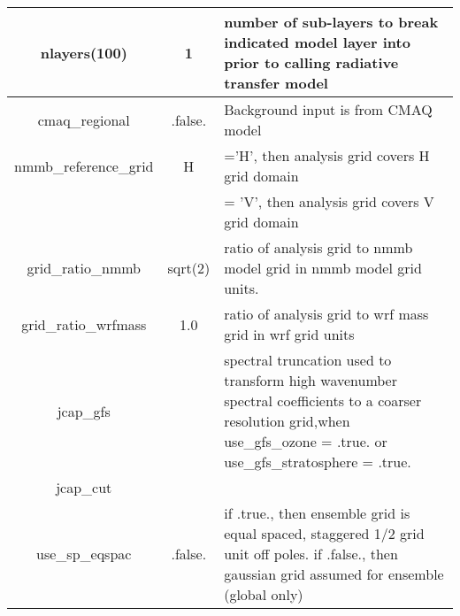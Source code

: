 \begin{table}[h]
\begin{tabular}{| c | c | p{9cm} |}
 \hline
 nlayers(100) & 1 & number of sub-layers to break indicated model layer into prior to calling radiative transfer model \\
 \hline
 cmaq\_regional & .false. & Background input is from CMAQ model \\
 \hline
 nmmb\_reference\_grid & H & ='H', then analysis grid covers H grid domain \\
                       & &   = 'V', then analysis grid covers V grid domain \\
 \hline
 grid\_ratio\_nmmb & sqrt(2) & ratio of analysis grid to nmmb model grid in nmmb model grid units. \\
 \hline
 grid\_ratio\_wrfmass & 1.0 & ratio of analysis grid to wrf mass grid in wrf grid units \\
 \hline
 jcap\_gfs & & spectral truncation used to transform high wavenumber spectral coefficients to a coarser resolution grid,when use\_gfs\_ozone = .true. or use\_gfs\_stratosphere = .true. \\
 \hline
 jcap\_cut & & \\
 \hline
 use\_sp\_eqspac & .false. & if .true., then ensemble grid is equal spaced, staggered 1/2 grid unit off poles.  if .false., then gaussian grid assumed for ensemble (global only) \\
 \hline
 \end{tabular}
\end{table}


